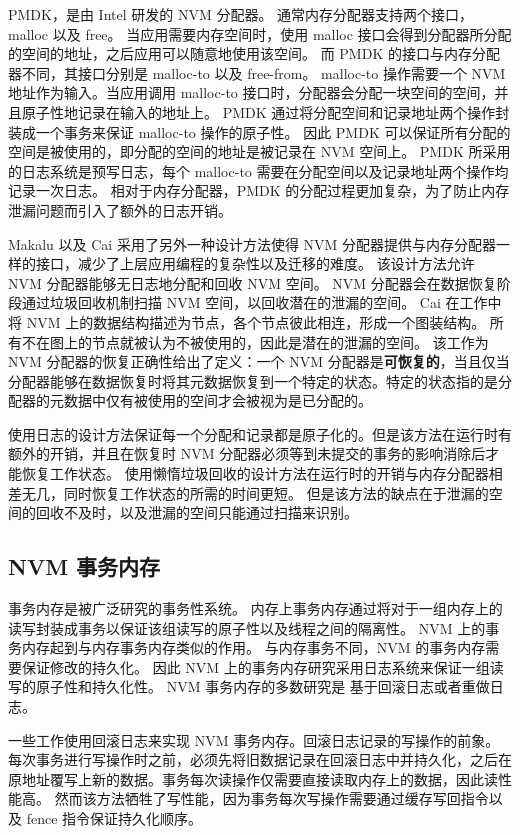 PMDK，是由 Intel 研发的 NVM 分配器\cite{pmdk}。
通常内存分配器支持两个接口，malloc 以及 free。
当应用需要内存空间时，使用 malloc 接口会得到分配器所分配的空间的地址，之后应用可以随意地使用该空间。
而 PMDK 的接口与内存分配器不同，其接口分别是 malloc-to 以及 free-from。
malloc-to 操作需要一个 NVM 地址作为输入。当应用调用 malloc-to 接口时，分配器会分配一块空间的空间，并且原子性地记录在输入的地址上。
PMDK 通过将分配空间和记录地址两个操作封装成一个事务来保证 malloc-to 操作的原子性。
因此 PMDK 可以保证所有分配的空间是被使用的，即分配的空间的地址是被记录在 NVM 空间上。
PMDK 所采用的日志系统是预写日志，每个 malloc-to 需要在分配空间以及记录地址两个操作均记录一次日志。
相对于内存分配器，PMDK 的分配过程更加复杂，为了防止内存泄漏问题而引入了额外的日志开销。

Makalu\cite{bhandari_makalu_2016} 以及 Cai\cite{cai_understanding_2020} 采用了另外一种设计方法使得 NVM 分配器提供与内存分配器一样的接口，减少了上层应用编程的复杂性以及迁移的难度。
该设计方法允许 NVM 分配器能够无日志地分配和回收 NVM 空间。
NVM 分配器会在数据恢复阶段通过垃圾回收机制扫描 NVM 空间，以回收潜在的泄漏的空间。
Cai 在工作中将 NVM 上的数据结构描述为节点，各个节点彼此相连，形成一个图装结构。
所有不在图上的节点就被认为不被使用的，因此是潜在的泄漏的空间。
该工作为 NVM 分配器的恢复正确性给出了定义：一个 NVM 分配器是\textbf{可恢复的}，当且仅当
分配器能够在数据恢复时将其元数据恢复到一个特定的状态。特定的状态指的是分配器的元数据中仅有被使用的空间才会被视为是已分配的。

使用日志的设计方法保证每一个分配和记录都是原子化的。但是该方法在运行时有额外的开销，并且在恢复时 NVM 分配器必须等到未提交的事务的影响消除后才能恢复工作状态。
使用懒惰垃圾回收的设计方法在运行时的开销与内存分配器相差无几，同时恢复工作状态的所需的时间更短。
但是该方法的缺点在于泄漏的空间的回收不及时，以及泄漏的空间只能通过扫描来识别。



\subsection{NVM 事务内存}

事务内存是被广泛研究的事务性系统。
内存上事务内存通过将对于一组内存上的读写封装成事务以保证该组读写的原子性以及线程之间的隔离性。
NVM 上的事务内存起到与内存事务内存类似的作用。
与内存事务不同，NVM 的事务内存需要保证修改的持久化。
因此 NVM 上的事务内存研究采用日志系统来保证一组读写的原子性和持久化性。
NVM 事务内存的多数研究是   基于回滚日志或者重做日志。

一些工作使用回滚日志来实现 NVM 事务内存\cite{coburn_nv-heaps_2011, kolli_high-performance_2016}。回滚日志记录的写操作的前象。每次事务进行写操作时之前，必须先将旧数据记录在回滚日志中并持久化，之后在原地址覆写上新的数据。事务每次读操作仅需要直接读取内存上的数据，因此读性能高。
然而该方法牺牲了写性能，因为事务每次写操作需要通过缓存写回指令以及 fence 指令保证持久化顺序。



